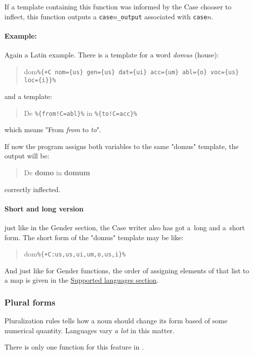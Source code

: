 If a template containing this function was informed by the Case chooser to inflect, this function outputs a \texttt{case$n$\_output} associated with \texttt{case$n$}.

\paragraph{Example:} Again a Latin example. There is a template for a word \emph{domus} (house):
\begin{quote}
	dom\verb-%{+C nom={us} gen={us} dat={ui} acc={um} abl={o} voc={us} loc={i}}%-
\end{quote}
and a template:
\begin{quote}
	De \verb+%{from!C=abl}%+ in \verb+%{to!C=acc}%+
\end{quote} which means "From \textit{from} to \textit{to}".

If now the program assigns both variables to the same "domus" template, the output will be:
\begin{quote}
	De \textbf{domo} in \textbf{domum}
\end{quote} correctly inflected.

\paragraph{Short and long version} just like in the Gender section, the Case writer also has got a~long and a~short form.
The short form of the "domus" template may be like:
\begin{quote}
	dom\verb-%{+C:us,us,ui,um,o,us,i}%-
\end{quote}

And just like for Gender functions, the order of assigning elements of that list to a map is given in the \hyperref[supLangs]{Supported languages section}.

\subsubsection{Plural forms}
Pluralization rules tells how a noun should change its form based of some numerical quantity. Languages vary \emph{a lot} in this matter. 

There is only one function for this feature in \mulan{}.

\vspace{1em}
 
